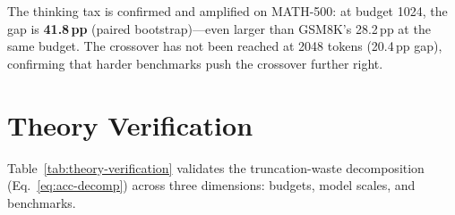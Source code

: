 The thinking tax is confirmed and amplified on MATH-500: at budget 1024, the gap is \textbf{41.8\,pp}  (paired bootstrap)---even larger than GSM8K's 28.2\,pp at the same budget.
The crossover has not been reached at 2048 tokens (20.4\,pp gap), confirming that harder benchmarks push the crossover further right.


\section{Theory Verification}
\label{app:theory-verification}

Table~\ref{tab:theory-verification} validates the truncation-waste decomposition
(Eq.~\ref{eq:acc-decomp}) across three dimensions: budgets, model scales, and benchmarks.


